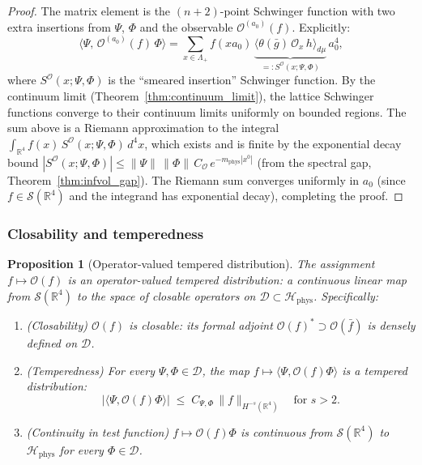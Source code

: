 \documentclass[11pt,a4paper]{amsart}
\newtheorem{proposition}[theorem]{Proposition}
\theoremstyle{definition}
\newcommand{\R}{\mathbb{R}}
\begin{document}
\begin{proof}
The matrix element is the $(n+2)$-point Schwinger function with two extra insertions
from $\Psi$, $\Phi$ and the observable $\mathcal{O}^{(a_0)}(f)$.  Explicitly:
\[
  \langle\Psi,\,\mathcal{O}^{(a_0)}(f)\,\Phi\rangle
  = \sum_{x\in\Lambda_+} f(xa_0)\,
    \underbrace{\bigl\langle\theta(\bar g)\,\mathcal{O}_x\,h\bigr\rangle_{d\mu}}_{=: S^{\mathcal{O}}(x;\Psi,\Phi)}\,a_0^4,
\]
where $S^\mathcal{O}(x;\Psi,\Phi)$ is the ``smeared insertion'' Schwinger function.
By the continuum limit (Theorem~\ref{thm:continuum_limit}), the lattice Schwinger
functions converge to their continuum limits uniformly on bounded regions.  The sum
above is a Riemann approximation to the integral
$\int_{\R^4} f(x)\,S^\mathcal{O}(x;\Psi,\Phi)\,d^4x$,
which exists and is finite by the exponential decay bound
$|S^\mathcal{O}(x;\Psi,\Phi)| \le \|\Psi\|\,\|\Phi\|\,C_\mathcal{O}\,e^{-m_{\mathrm{phys}}|x^0|}$
(from the spectral gap, Theorem~\ref{thm:infvol_gap}).
The Riemann sum converges uniformly in $a_0$ (since $f\in\mathcal{S}(\R^4)$ and
the integrand has exponential decay), completing the proof.
\end{proof}

\subsubsection*{Closability and temperedness}

\begin{proposition}[Operator-valued tempered distribution]
\label{prop:OVD}
The assignment $f \mapsto \mathcal{O}(f)$ is an \emph{operator-valued
tempered distribution}: a continuous linear map from $\mathcal{S}(\R^4)$
to the space of closable operators on $\mathcal{D}\subset\mathcal{H}_{\mathrm{phys}}$.
Specifically:
\begin{enumerate}[label=(\roman*)]
\item \emph{(Closability)} $\mathcal{O}(f)$ is closable: its formal adjoint
      $\mathcal{O}(f)^* \supset \mathcal{O}(\bar f)$ is densely defined on $\mathcal{D}$.
\item \emph{(Temperedness)} For every $\Psi,\Phi\in\mathcal{D}$, the map
      $f\mapsto\langle\Psi,\mathcal{O}(f)\Phi\rangle$ is a tempered distribution:
      \begin{equation}
      \label{eq:temperness}
        \bigl|\langle\Psi,\mathcal{O}(f)\Phi\rangle\bigr|
        \;\le\; C_{\Psi,\Phi}\,\|f\|_{H^{-s}(\R^4)}
        \quad\text{for }s > 2.
      \end{equation}
\item \emph{(Continuity in test function)} $f\mapsto\mathcal{O}(f)\Phi$ is continuous
      from $\mathcal{S}(\R^4)$ to $\mathcal{H}_{\mathrm{phys}}$ for every $\Phi\in\mathcal{D}$.
\end{enumerate}
\end{proposition}
\end{document}
